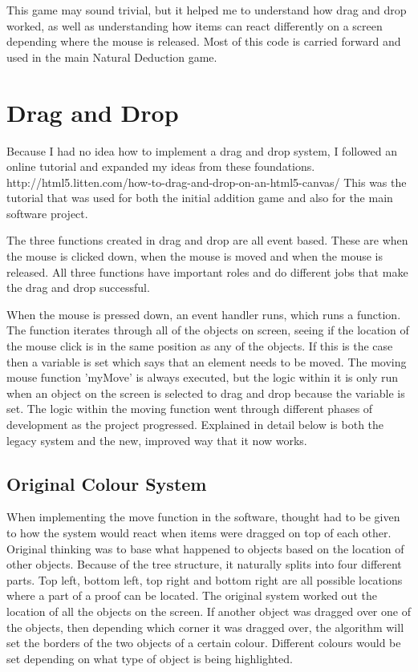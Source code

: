 This game may sound trivial, but it helped me to understand how drag and drop worked, as well as understanding how items can react differently on a screen depending where the mouse is released. Most of this code is carried forward and used in the main Natural Deduction game.

\section{Drag and Drop}

Because I had no idea how to implement a drag and drop system, I followed an online tutorial and expanded my ideas from these foundations. http://html5.litten.com/how-to-drag-and-drop-on-an-html5-canvas/ This was the tutorial that was used for both the initial addition game and also for the main software project.

The three functions created in drag and drop are all event based. These are when the mouse is clicked down, when the mouse is moved and when the mouse is released. All three functions have important roles and do different jobs that make the drag and drop successful.

When the mouse is pressed down, an event handler runs, which runs a function. The function iterates through all of the objects on screen, seeing if the location of the mouse click is in the same position as any of the objects. If this is the case then a variable is set which says that an element needs to be moved. The moving mouse function 'myMove' is always executed, but the logic within it is only run when an object on the screen is selected to drag and drop because the variable is set. The logic within the moving function went through different phases of development as the project progressed. Explained in detail below is both the legacy system and the new, improved way that it now works.

\subsection{Original Colour System}

When implementing the move function in the software, thought had to be given to how the system would react when items were dragged on top of each other. Original thinking was to base what happened to objects based on the location of other objects. Because of the tree structure, it naturally splits into four different parts. Top left, bottom left, top right and bottom right are all possible locations where a part of a proof can be located. The original system worked out the location of all the objects on the screen. If another object was dragged over one of the objects, then depending which corner it was dragged over, the algorithm will set the borders of the two objects of a certain colour. Different colours would be set depending on what type of object is being highlighted. 

